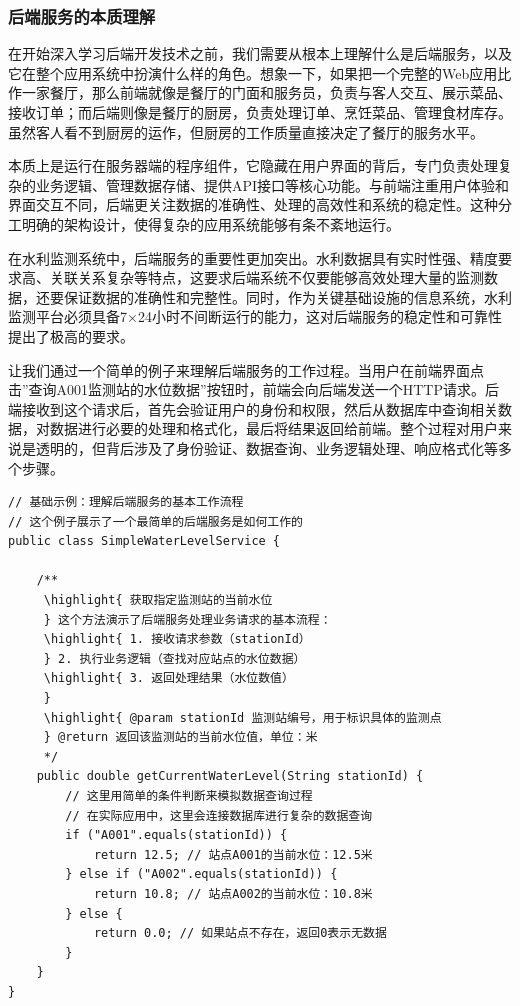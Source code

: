 \hypertarget{ux540eux7aefux670dux52a1ux7684ux672cux8d28ux7406ux89e3}{%
\subsubsection{后端服务的本质理解}\label{ux540eux7aefux670dux52a1ux7684ux672cux8d28ux7406ux89e3}}

在开始深入学习后端开发技术之前，我们需要从根本上理解什么是后端服务，以及它在整个应用系统中扮演什么样的角色。想象一下，如果把一个完整的Web应用比作一家餐厅，那么前端就像是餐厅的门面和服务员，负责与客人交互、展示菜品、接收订单；而后端则像是餐厅的厨房，负责处理订单、烹饪菜品、管理食材库存。虽然客人看不到厨房的运作，但厨房的工作质量直接决定了餐厅的服务水平。

本质上是运行在服务器端的程序组件，它隐藏在用户界面的背后，专门负责处理复杂的业务逻辑、管理数据存储、提供API接口等核心功能。与前端注重用户体验和界面交互不同，后端更关注数据的准确性、处理的高效性和系统的稳定性。这种分工明确的架构设计，使得复杂的应用系统能够有条不紊地运行。

在水利监测系统中，后端服务的重要性更加突出。水利数据具有实时性强、精度要求高、关联关系复杂等特点，这要求后端系统不仅要能够高效处理大量的监测数据，还要保证数据的准确性和完整性。同时，作为关键基础设施的信息系统，水利监测平台必须具备7×24小时不间断运行的能力，这对后端服务的稳定性和可靠性提出了极高的要求。

让我们通过一个简单的例子来理解后端服务的工作过程。当用户在前端界面点击''查询A001监测站的水位数据''按钮时，前端会向后端发送一个HTTP请求。后端接收到这个请求后，首先会验证用户的身份和权限，然后从数据库中查询相关数据，对数据进行必要的处理和格式化，最后将结果返回给前端。整个过程对用户来说是透明的，但背后涉及了身份验证、数据查询、业务逻辑处理、响应格式化等多个步骤。

\begin{lstlisting}[style=java]
// 基础示例：理解后端服务的基本工作流程
// 这个例子展示了一个最简单的后端服务是如何工作的
public class SimpleWaterLevelService {
    
    /**
     \highlight{ 获取指定监测站的当前水位
     } 这个方法演示了后端服务处理业务请求的基本流程：
     \highlight{ 1. 接收请求参数（stationId）
     } 2. 执行业务逻辑（查找对应站点的水位数据）
     \highlight{ 3. 返回处理结果（水位数值）
     } 
     \highlight{ @param stationId 监测站编号，用于标识具体的监测点
     } @return 返回该监测站的当前水位值，单位：米
     */
    public double getCurrentWaterLevel(String stationId) {
        // 这里用简单的条件判断来模拟数据查询过程
        // 在实际应用中，这里会连接数据库进行复杂的数据查询
        if ("A001".equals(stationId)) {
            return 12.5; // 站点A001的当前水位：12.5米
        } else if ("A002".equals(stationId)) {
            return 10.8; // 站点A002的当前水位：10.8米
        } else {
            return 0.0; // 如果站点不存在，返回0表示无数据
        }
    }
}
\end{lstlisting}

